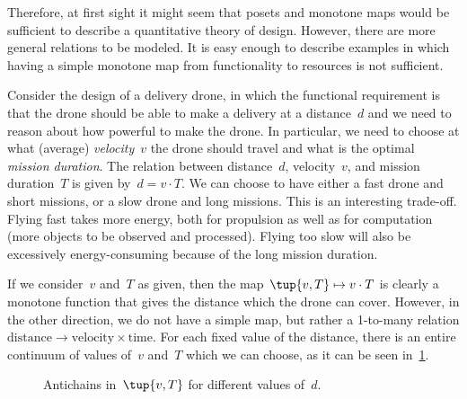 \begin{comment}
\begin{figure}[h!]
    \centering
    \begin{tikzcd}
    \bullet &\arrow[l] \bullet\\[-15pt]
    \text{mass} & \text{capacity}
    \end{tikzcd}
    \caption{Example of the design of a battery. \label{fig:battery-example}}
\end{figure}
\end{comment}

Therefore, at first sight it might seem that posets and monotone maps would be sufficient to describe a quantitative theory of design. However, there are more general relations to be modeled. It is easy enough to describe examples in which having a simple monotone map from functionality to resources is not sufficient.

\begin{example}
Consider the design of a delivery drone, in which the functional requirement is that the drone should be able to make a delivery at a distance~$d$ and we need to reason about how powerful to make the drone. In particular, we need to choose at what (average) \emph{velocity}~$v$ the drone  should travel and what is the optimal \emph{mission duration}. The relation between distance~$d$, velocity~$v$, and mission duration~$T$ is given by~$d=v\cdot T$. We can choose to have either a fast drone and short missions, or a slow drone and long missions. This is an interesting trade-off. Flying fast takes more energy, both for propulsion as well as for computation (more objects to be observed and processed). Flying too slow will also be excessively energy-consuming because of the long mission duration.

If we consider~$v$ and~$T$ as given, then the map~$\tup{v,T} \mapsto v\cdot T$ is clearly a monotone function that gives the distance which the drone can cover. However, in the other direction, we do not have a simple map, but rather a 1-to-many relation $\mathrm{distance}\to \mathrm{velocity}\times \mathrm{time}$. For each fixed value of the distance, there is an entire continuum of values of~$v$ and~$T$ which we can choose, as it can be seen in~\cref{fig:drone-example-antichain}.

\begin{figure}[h!]
    \centering
    \caption{Antichains in~$\tup{v,T}$ for different values of~$d$. \label{fig:drone-example}
    \label{fig:drone-example-antichain}}
\end{figure}

\end{example}

